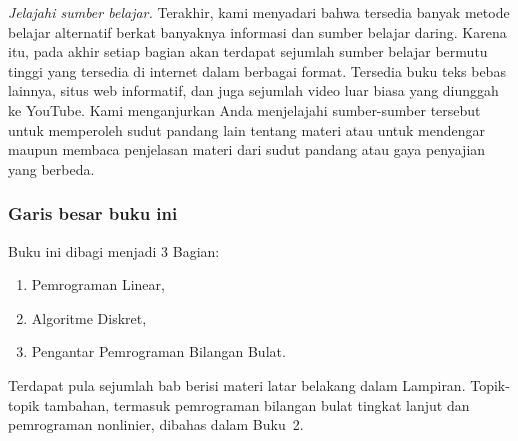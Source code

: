 \emph{Jelajahi sumber belajar.} Terakhir, kami menyadari bahwa tersedia banyak metode belajar alternatif berkat banyaknya informasi dan sumber belajar daring.   Karena itu, pada akhir setiap bagian akan terdapat sejumlah sumber belajar bermutu tinggi yang tersedia di internet dalam berbagai format.   Tersedia buku teks bebas lainnya, situs web informatif, dan juga sejumlah video luar biasa yang diunggah ke YouTube.  Kami menganjurkan Anda menjelajahi sumber-sumber tersebut untuk memperoleh sudut pandang lain tentang materi atau untuk mendengar maupun membaca penjelasan materi dari sudut pandang atau gaya penyajian yang berbeda.  

\subsubsection*{Garis besar buku ini}
Buku ini dibagi menjadi 3 Bagian:

\begin{enumerate}
\item[Bagian I] Pemrograman Linear,
\item[Bagian II] Algoritme Diskret,
\item[Bagian III] Pengantar Pemrograman Bilangan Bulat.
\end{enumerate}
Terdapat pula sejumlah bab berisi materi latar belakang dalam Lampiran.  Topik-topik tambahan, termasuk pemrograman bilangan bulat tingkat lanjut dan pemrograman nonlinier, dibahas dalam Buku~2.
